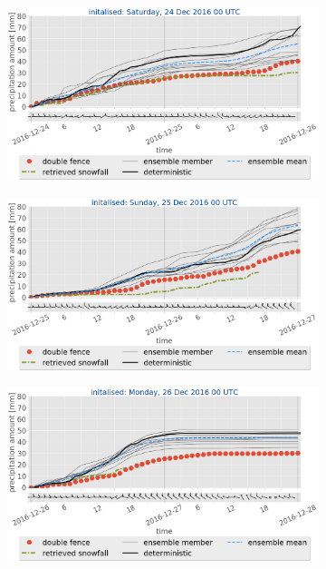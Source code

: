 \begin{figure}[H]%
	\centering
	\begin{subfigure}[t]{0.97\textwidth}			\includegraphics[trim={0.cm 5.2cm 0.cm 0cm},clip,width=\textwidth]{./fig_sfc_acc/acc_wind_20161224_00}
		\caption{}\label{fig:sfc_acc24}
	\end{subfigure}
	\begin{subfigure}[t]{0.97\textwidth}
		\includegraphics[trim={0.cm 3.6cm 0.cm 0cm},clip,width=\textwidth]{./fig_sfc_acc/acc_wind_20161225_00}
		\caption{}\label{fig:sfc_acc25}
	\end{subfigure}
	\begin{subfigure}[t]{0.97\textwidth}	\includegraphics[trim={0.cm 3.6cm 0.cm 0cm},clip,width=\textwidth]{./fig_sfc_acc/acc_wind_20161226_00}

\end{subfigure}
\end{figure}
